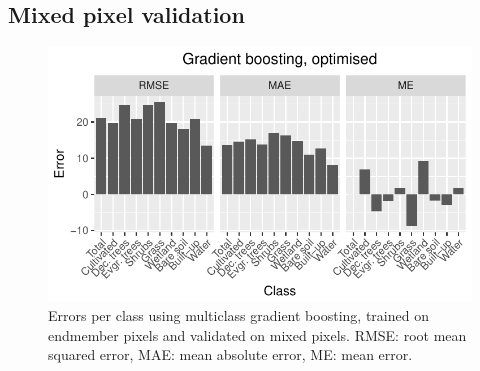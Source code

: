 \documentclass[a4paper,10pt]{book}
\begin{document}
\begin{appendices}
 \section{Mixed pixel validation}
 \begin{figure}
  \centering
  \includegraphics[width=\textwidth]{../plot/perclass-errors-gb}
  \caption{Errors per class using multiclass gradient boosting, trained on endmember pixels and validated on mixed pixels. RMSE: root mean squared error, MAE: mean absolute error, ME: mean error.}
  \label{fig-perclass-errors-gb}
 \end{figure}
\end{appendices}
\end{document}
